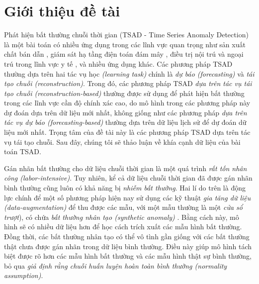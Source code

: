 \chapter{Giới thiệu đề tài}
\label{Chapter1}


\pagebreak
Phát hiện bất thường chuỗi thời gian (TSAD - Time Series Anomaly Detection) là một bài toán có nhiều ứng dụng trong các lĩnh vực quan trọng như sản xuất chất bán dẫn \cite{11456978}, giám sát hạ tầng điện toán đám mây \cite{10.1145/3637528.3671936} \cite{9966938} \cite{11121677}, điều trị nội trú và ngoại trú trong lĩnh vực y tế \cite{NEURIPS2023_7a53bf4e}, và nhiều ứng dụng khác. Các phương pháp TSAD thường dựa trên hai tác vụ học \textit{(learning task)} chính là \textit{dự báo (forecasting)} và \textit{tái tạo chuỗi (reconstruction)}. Trong đó, các phương pháp TSAD \textit{dựa trên tác vụ tái tạo chuỗi (reconstruction-based)} thường được sử dụng để phát hiện bất thường trong các lĩnh vực cần độ chính xác cao, do mô hình trong các phương pháp này dự đoán dựa trên dữ liệu mới nhất, không giống như các phương pháp \textit{dựa trên tác vụ dự báo (forecasting-based)} thường dựa trên dữ liệu lịch sử để dự đoán dữ liệu mới nhất. Trọng tâm của đề tài này là các phương pháp TSAD dựa trên tác vụ tái tạo chuỗi. Sau đây, chúng tôi sẽ thảo luận về khía cạnh dữ liệu của bài toán TSAD.

Gán nhãn bất thường cho dữ liệu chuỗi thời gian là một quá trình \textit{rất tốn nhân công (labor-intensive)}. Tuy nhiên, kể cả dữ liệu chuỗi thời gian đã được gán nhãn bình thường cũng luôn có khả năng bị \textit{nhiễm bất thường}. Hai lí do trên là động lực chính để một số phương pháp hiện nay sử dụng các kỹ thuật \textit{gia tăng dữ liệu (data-augmentation)} để thu được các mẫu, với một mẫu thường là một \textit{cửa sổ trượt}), có chứa \textit{bất thường nhân tạo (synthetic anomaly)} \cite{10.1145/3711896.3737110} \cite{jeong2026pgrfnet} \cite{darban_carla_2025}. Bằng cách này, mô hình sẽ có nhiều dữ liệu hơn để học cách trích xuất các mẫu hình bất thường. Đồng thời, các bất thường nhân tạo có thể vô tình gần giống với các bất thường thật chưa được gán nhãn trong dữ liệu bình thường. Điều này giúp mô hình tách biệt được rõ hơn các mẫu hình bất thường và các mẫu hình thật sự bình thường, bỏ qua \textit{giả định rằng chuỗi huấn luyện hoàn toàn bình thường (normality assumption)}.

